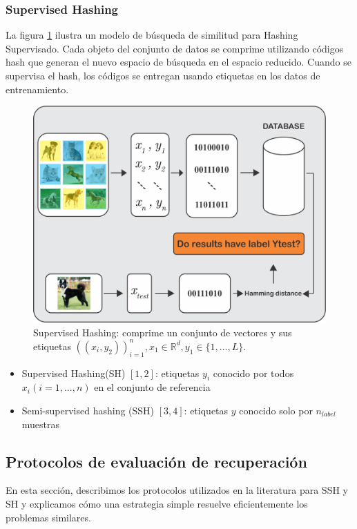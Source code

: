 \subsubsection{Supervised Hashing}
La figura \ref{supervisedhashingcap5} ilustra un modelo de búsqueda de similitud para Hashing Supervisado. Cada objeto del conjunto de datos se comprime utilizando códigos hash que generan el nuevo espacio de búsqueda en el espacio reducido. Cuando se supervisa el hash, los códigos se entregan usando etiquetas en los datos de entrenamiento.

\begin{figure}[htp]
\label{supervisedhashingcap5}
\includegraphics[width=0.7\columnwidth]{chapter5/ima2.png}
\centering
\caption{ Supervised Hashing: comprime un conjunto de vectores y sus etiquetas $((x_i,y_2))^{n}_{i=1}, x_1\in \mathbb{R}^{d}, y_1 \in \{1,...,L\} $.}
\end{figure}

\begin{itemize}
\item Supervised Hashing(SH) $ [1, 2] $: etiquetas $ y_i $ conocido por todos $ x_i (i = 1, ..., n) $ en el conjunto de referencia
\item Semi-supervised hashing (SSH) $ [3, 4] $: etiquetas $ y $ conocido solo por $ n_{label} $ muestras
\end{itemize}

\subsection{Protocolos de evaluación de recuperación}
En esta sección, describimos los protocolos utilizados en la literatura para SSH y SH y explicamos cómo una estrategia simple resuelve eficientemente los problemas similares.

